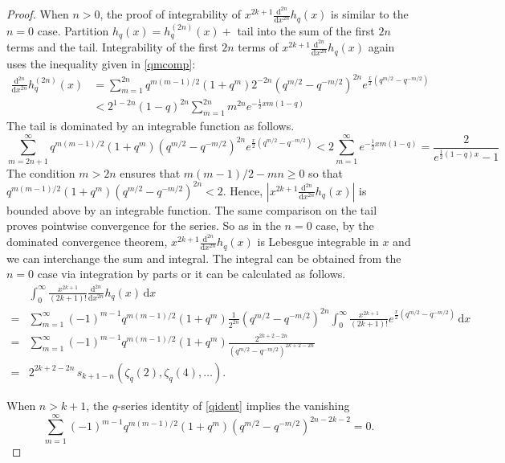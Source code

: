 \documentclass[a4paper]{article}
\theoremstyle{plain}
\theoremstyle{definition}
\newcommand{\dd}{\mathrm{d}}
\renewcommand{\geq}{\geqslant}
\begin{document}
\begin{proof}
When $n>0$, the proof of integrability of $x^{2k+1} \frac{\dd^{2n}}{\dd x^{2n}} h_q(x)$ is similar to the $n=0$ case.  Partition $h_q(x)=h_q^{(2n)}(x)+$ tail into the sum of the first $2n$ terms and the tail. Integrability of the first $2n$ terms of $x^{2k+1} \frac{\dd^{2n}}{\dd x^{2n}} h_q(x)$ again uses the inequality given in \cref{qmcomp}:
\begin{align*}
\frac{\dd^{2n}}{\dd x^{2n}} h_q^{(2n)}(x) 
&= \sum_{m=1}^{2n} q^{m(m-1)/2}(1+q^m)2^{-2n} \left(q^{m/2}-q^{-m/2}\right)^{2n}e^{\frac{x}{2} (q^{m/2}-q^{-m/2})} \\
&< 2^{1-2n}(1-q)^{2n}\sum_{m=1}^{2n} m^{2n}e^{-\frac{1}{2}xm(1-q)}
\end{align*}
The tail is dominated by an integrable function as follows.
\[
\sum_{m=2n+1}^\infty q^{m(m-1)/2}(1+q^m) (q^{m/2}-q^{-m/2})^{2n}e^{\frac{x}{2}\left(q^{m/2}-q^{-m/2}\right)} < 2\sum_{m=1}^\infty e^{-\frac{1}{2}xm(1-q)}=\frac{2}{e^{\frac{1}{2}(1-q)x}-1}
\]
The condition $m>2n$ ensures that $m(m-1)/2-mn\geq0$ so that $q^{m(m-1)/2}(1+q^m)\left(q^{m/2}-q^{-m/2}\right)^{2n}<2$. Hence, $\left| x^{2k+1} \frac{\dd^{2n}}{\dd x^{2n}} h_q(x) \right|$ is bounded above by an integrable function.
The same comparison on the tail proves pointwise convergence for the series. So as in the $n=0$ case, by the dominated convergence theorem, $x^{2k+1} \frac{\dd^{2n}}{\dd x^{2n}} h_q(x)$ is Lebesgue integrable in $x$ and we can interchange the sum and integral. The integral can be obtained from the $n=0$ case via integration by parts or it can be calculated as follows.
\begin{align*} 
& \int_0^\infty \!\! \frac{x^{2k+1}}{(2k+1)!} \frac{\dd^{2n}}{\dd x^{2n}} h_q(x) \, \dd x \\
={}& \sum_{m=1}^\infty (-1)^{m-1}q^{m(m-1)/2}(1+q^m)\tfrac{1}{2^{2n}} (q^{m/2}-q^{-m/2})^{2n} \int_0^\infty \!\! \frac{x^{2k+1}}{(2k+1)!}e^{\frac{x}{2}(q^{m/2}-q^{-m/2})} \, \dd x \\
={}& \sum_{m=1}^\infty (-1)^{m-1}q^{m(m-1)/2}(1+q^m)\frac{ 2^{2k+2-2n}}{(q^{m/2}-q^{-m/2})^{2k+2-2n}} \\
={}& 2^{2k+2-2n} \, s_{k+1-n}\left(\zeta_q(2), \zeta_q(4), \ldots \right).
\end{align*} 


When $n>k+1$, the $q$-series identity of \cref{qident} implies the vanishing
\[
\sum_{m=1}^\infty (-1)^{m-1}q^{m(m-1)/2}(1+q^m)(q^{m/2}-q^{-m/2})^{2n-2k-2} = 0.
\]



\end{proof}
\end{document}
